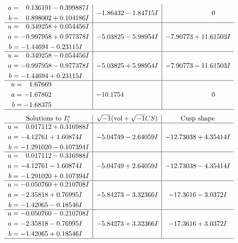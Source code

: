 \documentclass[1p]{elsarticle_modified}
\theoremstyle{definition}
\newcommand{\I}{\sqrt{-1}}
\begin{document}
$$\begin{array}{c|c|c}
\begin{aligned}
a &= \phantom{-}0.136191 - 0.399887 I \\
b &= \phantom{-}0.898002 + 0.104186 I\end{aligned}
 & -1.86432 - 1.84715 I & \phantom{-0.000000 } 0 \\ \hline\begin{aligned}
u &= \phantom{-}0.349258 + 0.054456 I \\
a &= -0.997958 + 0.977378 I \\
b &= -1.44694 - 0.23115 I\end{aligned}
 & -5.03825 - 5.98954 I & -7.90773 + 11.61503 I \\ \hline\begin{aligned}
u &= \phantom{-}0.349258 - 0.054456 I \\
a &= -0.997958 - 0.977378 I \\
b &= -1.44694 + 0.23115 I\end{aligned}
 & -5.03825 + 5.98954 I & -7.90773 - 11.61503 I \\ \hline\begin{aligned}
u &= \phantom{-}1.67669\phantom{ +0.000000I} \\
a &= -1.67862\phantom{ +0.000000I} \\
b &= -1.68375\phantom{ +0.000000I}\end{aligned}
 & -10.1754\phantom{ +0.000000I} & \phantom{-0.000000 } 0\\
 \hline 
 \end{array}$$\newpage$$\begin{array}{c|c|c}  
\text{Solutions to }I^u_{1}& \I (\text{vol} + \sqrt{-1}CS) & \text{Cusp shape}\\
 \hline 
\begin{aligned}
u &= \phantom{-}0.017112 + 0.316988 I \\
a &= -4.12761 + 1.60874 I \\
b &= -1.291020 - 0.107394 I\end{aligned}
 & -5.04749 - 2.64059 I & -12.73038 + 4.35414 I \\ \hline\begin{aligned}
u &= \phantom{-}0.017112 - 0.316988 I \\
a &= -4.12761 - 1.60874 I \\
b &= -1.291020 + 0.107394 I\end{aligned}
 & -5.04749 + 2.64059 I & -12.73038 - 4.35414 I \\ \hline\begin{aligned}
u &= -0.050760 + 0.210708 I \\
a &= -2.35818 + 0.76995 I \\
b &= -1.42065 - 0.18546 I\end{aligned}
 & -5.84273 - 3.32366 I & -17.3616 - 3.0372 I \\ \hline\begin{aligned}
u &= -0.050760 - 0.210708 I \\
a &= -2.35818 - 0.76995 I \\
b &= -1.42065 + 0.18546 I\end{aligned}
 & -5.84273 + 3.32366 I & -17.3616 + 3.0372 I\\
 \hline 
 \end{array}$$\newpage\newpage\renewcommand{\arraystretch}{1}
\end{document}
